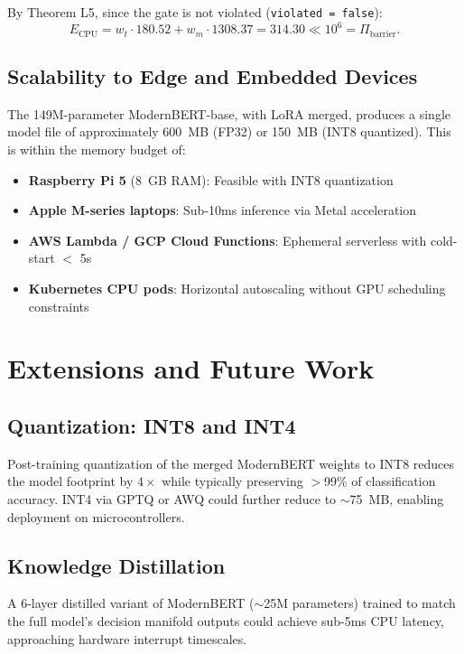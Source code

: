 \documentclass[10pt,journal,compsoc]{IEEEtran}
\theoremstyle{remark}
\begin{document}
By Theorem L5, since the gate is not violated (\texttt{violated = false}):
\begin{equation}
E_{\text{CPU}} = w_t \cdot 180.52 + w_m \cdot 1308.37 = 314.30 \ll 10^6 = \Pi_{\text{barrier}}.
\end{equation}

\subsection{Scalability to Edge and Embedded Devices}

The 149M-parameter ModernBERT-base, with LoRA merged, produces a single model file of approximately 600~MB (FP32) or 150~MB (INT8 quantized). This is within the memory budget of:
\begin{itemize}
    \item \textbf{Raspberry Pi 5} (8~GB RAM): Feasible with INT8 quantization
    \item \textbf{Apple M-series laptops}: Sub-10ms inference via Metal acceleration
    \item \textbf{AWS Lambda / GCP Cloud Functions}: Ephemeral serverless with cold-start $<$ 5s
    \item \textbf{Kubernetes CPU pods}: Horizontal autoscaling without GPU scheduling constraints
\end{itemize}

\section{Extensions and Future Work}

\subsection{Quantization: INT8 and INT4}
Post-training quantization of the merged ModernBERT weights to INT8 reduces the model footprint by $4\times$ while typically preserving $>$99\% of classification accuracy. INT4 via GPTQ or AWQ could further reduce to $\sim$75~MB, enabling deployment on microcontrollers.

\subsection{Knowledge Distillation}
A 6-layer distilled variant of ModernBERT ($\sim$25M parameters) trained to match the full model's decision manifold outputs could achieve sub-5ms CPU latency, approaching hardware interrupt timescales.
\end{document}
